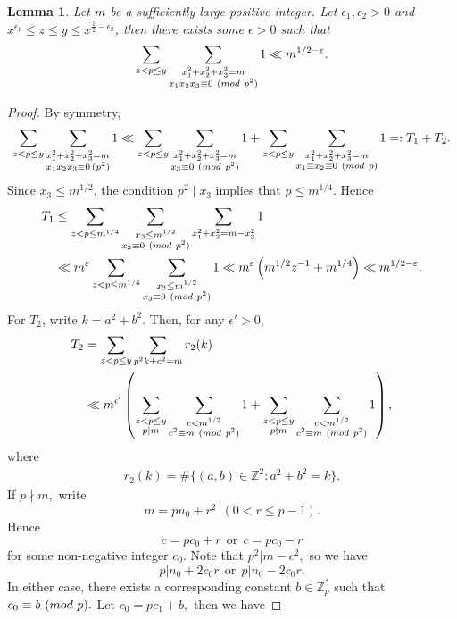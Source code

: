 \documentclass[10pt,a4paper]{amsart}
\numberwithin{equation}{section}
\def\Z{{\mathbb Z}}
\def\pmod #1{\ ({\rm{mod}}\ #1)}
\newtheorem{lemma}{Lemma}
\begin{document}
\begin{lemma}\label{lem3}
Let $m$ be a sufficiently large positive integer. Let $\epsilon_1, \epsilon_2>0$ and  $x^{\epsilon_1} \leq z \leq y \leq x^{\frac{1}{2}-\epsilon_2}$,
then there exists some $\epsilon>0$ such that
$$\sum_{z<p\leq y}\sum_{\substack{x_1^2+x_2^2+x_3^2 = m \\ x_1x_2x_3 \equiv 0 \pmod{p^2}}} 1\ll m^{1/2-\varepsilon}.$$
\end{lemma}
\begin{proof}
By symmetry,
\[
\sum_{z<p\leq y}\sum_{\substack{x_1^2+x_2^2+x_3^2 = m \\ x_1x_2x_3 \equiv 0 \, (p^2)}} 1 \ll \sum_{z<p\leq y}\sum_{\substack{x_1^2+x_2^2+x_3^2 = m \\ x_3 \equiv 0 \pmod{p^2}}} 1 + \sum_{z<p\leq y}\sum_{\substack{x_1^2+x_2^2+x_3^2 = m \\ x_1 \equiv x_2 \equiv 0 \pmod{p}}} 1 =: T_1 + T_2.
\]
Since $x_3 \leq m^{1/2}$, the condition $p^2 \mid x_3$ implies that $p \leq m^{1/4}$. Hence
\begin{align}\label{20}
T_1
&\leq
\sum_{z<p\leq m^{1/4}}
\sum_{\substack{x_3\leq m^{1/2}\\ x_3\equiv0\pmod {p^2}}}
\sum_{x_1^2+x_2^2=m-x_3^2}1 \notag\\
&\ll
m^\varepsilon
\sum_{z<p\leq m^{1/4}}
\sum_{\substack{x_3\leq m^{1/2}\\ x_3\equiv0\pmod {p^2}}}1
\ll
m^\varepsilon\left(m^{1/2}z^{-1}+m^{1/4}\right)
\ll m^{1/2-\varepsilon}.
\end{align}
For $T_2$, write $k=a^2+b^2$. Then, for any $\epsilon'>0$,
\begin{align*}
T_2
&=\sum_{z<p\leq y}\sum_{p^2k+c^2=m}r_2(k)\\
&\ll m^{\epsilon'}
\left(
\sum_{\substack{z<p\leq y\\ p\mid m}}
\sum_{\substack{c<m^{1/2}\\ c^2\equiv m\pmod {p^2}}}1
+
\sum_{\substack{z<p\leq y\\ p\nmid m}}
\sum_{\substack{c<m^{1/2}\\ c^2\equiv m\pmod {p^2}}}1
\right),
\end{align*}
where
\begin{align*}
r_{2}(k)=\#\{(a,b)\in \mathbb{Z}^{2}:a^{2}+b^{2}=k\}.
\end{align*}
If $p\nmid m,$ write $$m=pn_{0}+r^{2}\ \ (0<r \leq p-1).$$
Hence $$c=pc_{0}+r\ \ \mbox{or}\ \ c=pc_{0}-r$$ for some non-negative integer $c_{0}.$ Note that $p^{2}|m-c^{2},$ so we have
$$p|n_{0}+2c_{0}r\ \ \mbox{or}\ \ p|n_{0}-2c_{0}r.$$ In either case, there exists a corresponding constant $b\in \Z_p^{*}$ such that $c_{0}\equiv b\pmod p.$ Let $c_{0}=pc_{1}+b,$ then we have

\end{proof}
\end{document}
